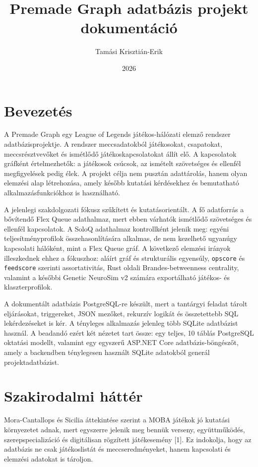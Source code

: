 \documentclass[12pt,a4paper]{article}
\title{Premade Graph adatbázis projekt dokumentáció}
\author{Tamási Krisztián-Erik}
\date{2026}
\begin{document}
\maketitle

\section{Bevezetés}

A Premade Graph egy League of Legends játékos-hálózati elemző rendszer adatbázisprojektje. A rendszer meccsadatokból játékosokat, csapatokat, meccsrésztvevőket és ismétlődő játékoskapcsolatokat állít elő. A kapcsolatok gráfként értelmezhetők: a játékosok csúcsok, az ismételt szövetséges és ellenfél megfigyelések pedig élek. A projekt célja nem pusztán adattárolás, hanem olyan elemzési alap létrehozása, amely később kutatási kérdésekhez és bemutatható alkalmazásfunkciókhoz is használható.

A jelenlegi szakdolgozati fókusz szűkített és kutatásorientált. A fő adatforrás a bővítendő Flex Queue adathalmaz, mert ebben várhatók ismétlődő szövetséges és ellenfél kapcsolatok. A SoloQ adathalmaz kontrollként jelenik meg: egyéni teljesítményprofilok összehasonlítására alkalmas, de nem kezelhető ugyanúgy kapcsolati hálóként, mint a Flex Queue gráf. A következő elemzési irányok illeszkednek ehhez a fókuszhoz: aláírt gráf és strukturális egyensúly, \texttt{opscore} és \texttt{feedscore} szerinti assortativitás, Rust oldali Brandes-betweenness centrality, valamint a későbbi Genetic NeuroSim v2 számára exportálható játékos- és klaszterprofilok.

A dokumentált adatbázis PostgreSQL-re készült, mert a tantárgyi feladat tárolt eljárásokat, triggereket, JSON mezőket, rekurzív logikát és összetettebb SQL lekérdezéseket is kér. A tényleges alkalmazás jelenleg több SQLite adatbázist használ. A beadandó ezért két nézetet tart össze: egy teljes, 10 táblás PostgreSQL oktatási modellt, valamint egy egyszerű ASP.NET Core adatbázis-böngészőt, amely a backendben ténylegesen használt SQLite adatokból generál projektadatbázist.

\section{Szakirodalmi háttér}

Mora-Cantallops és Sicilia áttekintése szerint a MOBA játékok jó kutatási környezetet adnak, mert egyszerre jelenik meg bennük verseny, együttműködés, szerepspecializáció és digitálisan rögzített játékesemény [1]. Ez indokolja, hogy az adatbázis ne csak játékoslistát és meccseredményeket, hanem kapcsolati és elemzési adatokat is tároljon.
\end{document}
